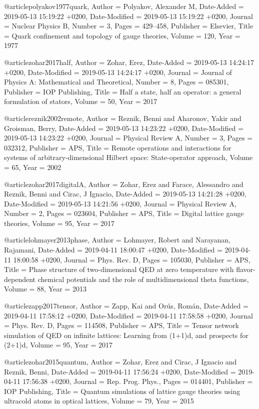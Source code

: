 \documentclass[epj,final]{svjour}
\begin{document}
@article{polyakov1977quark,
	Author = {Polyakov, Alexander M},
	Date-Added = {2019-05-13 15:19:22 +0200},
	Date-Modified = {2019-05-13 15:19:22 +0200},
	Journal = {Nuclear Physics B},
	Number = {3},
	Pages = {429--458},
	Publisher = {Elsevier},
	Title = {Quark confinement and topology of gauge theories},
	Volume = {120},
	Year = {1977}}

@article{zohar2017half,
	Author = {Zohar, Erez},
	Date-Added = {2019-05-13 14:24:17 +0200},
	Date-Modified = {2019-05-13 14:24:17 +0200},
	Journal = {Journal of Physics A: Mathematical and Theoretical},
	Number = {8},
	Pages = {085301},
	Publisher = {IOP Publishing},
	Title = {Half a state, half an operator: a general formulation of stators},
	Volume = {50},
	Year = {2017}}

@article{reznik2002remote,
	Author = {Reznik, Benni and Aharonov, Yakir and Groisman, Berry},
	Date-Added = {2019-05-13 14:23:22 +0200},
	Date-Modified = {2019-05-13 14:23:22 +0200},
	Journal = {Physical Review A},
	Number = {3},
	Pages = {032312},
	Publisher = {APS},
	Title = {Remote operations and interactions for systems of arbitrary-dimensional Hilbert space: State-operator approach},
	Volume = {65},
	Year = {2002}}

@article{zohar2017digitalA,
	Author = {Zohar, Erez and Farace, Alessandro and Reznik, Benni and Cirac, J Ignacio},
	Date-Added = {2019-05-13 14:21:28 +0200},
	Date-Modified = {2019-05-13 14:21:56 +0200},
	Journal = {Physical Review A},
	Number = {2},
	Pages = {023604},
	Publisher = {APS},
	Title = {Digital lattice gauge theories},
	Volume = {95},
	Year = {2017}}

@article{lohmayer2013phase,
	Author = {Lohmayer, Robert and Narayanan, Rajamani},
	Date-Added = {2019-04-11 18:00:47 +0200},
	Date-Modified = {2019-04-11 18:00:58 +0200},
	Journal = {Phys. Rev. D},
	Pages = {105030},
	Publisher = {APS},
	Title = {Phase structure of two-dimensional QED at zero temperature with flavor-dependent chemical potentials and the role of multidimensional theta functions},
	Volume = {88},
	Year = {2013}}

@article{zapp2017tensor,
	Author = {Zapp, Kai and Or{\'u}s, Rom{\'a}n},
	Date-Added = {2019-04-11 17:58:12 +0200},
	Date-Modified = {2019-04-11 17:58:58 +0200},
	Journal = {Phys. Rev. D},
	Pages = {114508},
	Publisher = {APS},
	Title = {Tensor network simulation of {QED} on infinite lattices: Learning from (1+1)d, and prospects for (2+1)d},
	Volume = {95},
	Year = {2017}}

@article{zohar2015quantum,
	Author = {Zohar, Erez and Cirac, J Ignacio and Reznik, Benni},
	Date-Added = {2019-04-11 17:56:24 +0200},
	Date-Modified = {2019-04-11 17:56:38 +0200},
	Journal = {Rep. Prog. Phys.},
	Pages = {014401},
	Publisher = {IOP Publishing},
	Title = {Quantum simulations of lattice gauge theories using ultracold atoms in optical lattices},
	Volume = {79},
	Year = {2015}}
\end{document}
